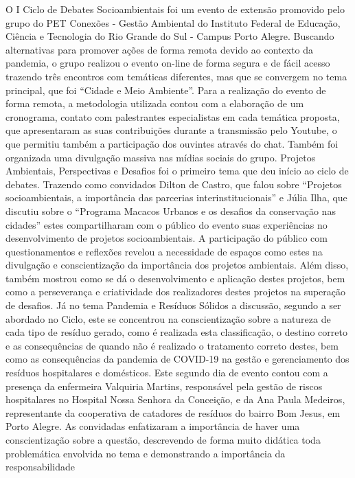 O I Ciclo de Debates Socioambientais foi um evento de extensão promovido pelo
grupo do PET Conexões - Gestão Ambiental do Instituto Federal de Educação, Ciência e
Tecnologia do Rio Grande do Sul - Campus Porto Alegre. Buscando alternativas para promover
ações de forma remota devido ao contexto da pandemia, o grupo realizou o evento on-line de
forma segura e de fácil acesso trazendo três encontros com temáticas diferentes, mas que se
convergem no tema principal, que foi “Cidade e Meio Ambiente”. Para a realização do evento de
forma remota, a metodologia utilizada contou com a elaboração de um cronograma, contato com
palestrantes especialistas em cada temática proposta, que apresentaram as suas contribuições
durante a transmissão pelo Youtube, o que permitiu também a participação dos ouvintes através
do chat. Também foi organizada uma divulgação massiva nas mídias sociais do grupo.
Projetos Ambientais, Perspectivas e Desafios foi o primeiro tema que deu início ao ciclo de
debates. Trazendo como convidados Dilton de Castro, que falou sobre “Projetos socioambientais,
a importância das parcerias interinstitucionais” e Júlia Ilha, que discutiu sobre o “Programa
Macacos Urbanos e os desafios da conservação nas cidades” estes compartilharam com o público
do evento suas experiências no desenvolvimento de projetos socioambientais. A participação do
público com questionamentos e reflexões revelou a necessidade de espaços como estes na
divulgação e conscientização da importância dos projetos ambientais. Além disso, também
mostrou como se dá o desenvolvimento e aplicação destes projetos, bem como a perseverança e
criatividade dos realizadores destes projetos na superação de desafios.
Já no tema Pandemia e Resíduos Sólidos a discussão, segundo a ser abordado no Ciclo,
este se concentrou na conscientização sobre a natureza de cada tipo de resíduo gerado, como é
realizada esta classificação, o destino correto e as consequências de quando não é realizado o
tratamento correto destes, bem como as consequências da pandemia de COVID-19 na gestão e
gerenciamento dos resíduos hospitalares e domésticos. Este segundo dia de evento contou com a
presença da enfermeira Valquiria Martins, responsável pela gestão de riscos hospitalares no
Hospital Nossa Senhora da Conceição, e da Ana Paula Medeiros, representante da cooperativa de
catadores de resíduos do bairro Bom Jesus, em Porto Alegre. As convidadas enfatizaram a
importância de haver uma conscientização sobre a questão, descrevendo de forma muito didática
toda problemática envolvida no tema e demonstrando a importância da responsabilidade
